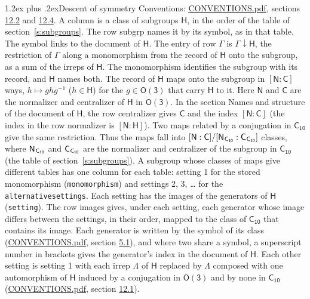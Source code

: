 \documentclass[10pt,a4paper]{article}
\makeatletter
\renewcommand\section{\@startsection{section}{1}{\z@}{-3ex plus -1ex minus -.2ex}%
  {1.2ex plus .2ex}{\normalfont\large\sffamily\bfseries\color{parttitle}}}
\numberwithin{equation}{section}
\newcommand{\grp}[1]{\mathsf{#1}}
\newcommand{\grpindex}[2]{[#1 : #2]}
\newcommand{\restr}[2]{#1\!\downarrow#2}
\newcommand{\hairsp}{\mkern1mu}
\makeatother
\begin{document}
\section{Descent of symmetry}\label{s:subduction}
Conventions: \href{../../CONVENTIONS.pdf}{CONVENTIONS.pdf}, sections \href{../../CONVENTIONS.pdf\#conv.12.2}{12.2} and \href{../../CONVENTIONS.pdf\#conv.12.4}{12.4}.
A column is a class of subgroups $\grp{H}$, in the order of the table of section~\ref{s:subgroups}. The row subgrp names it by its symbol, as in that table. The symbol links to the document of $\grp{H}$. The entry of row $\Gamma$ is $\restr{\Gamma}{\grp{H}}$, the restriction of $\Gamma$ along a monomorphism from the record of $\grp{H}$ onto the subgroup, as a sum of the irreps of $\grp{H}$. The monomorphism identifies the subgroup with its record, and $\grp{H}$ names both. \label{n:group.normalizer.o3}\label{n:group.centralizer.o3}The record of $\grp{H}$ maps onto the subgroup in $\grpindex{\grp{N}}{\grp{C}}$ ways, $h \mapsto g h g^{-1}$ ($h \in \grp{H}$) for the $g \in \grp{O(3)}$ that carry $\grp{H}$ to it. Here $\grp{N}$ and $\grp{C}$ are the normalizer and centralizer of $\grp{H}$ in \href{O3.pdf}{$\grp{O(3)}$}. In the section Names and structure of the document of $\grp{H}$, the row centralizer gives $\grp{C}$ and the index $\grpindex{\grp{N}}{\grp{C}}$ (the index in the row normalizer is $\grpindex{\grp{N}}{\grp{H}}$). Two maps related by a conjugation in $\grp{C_{10}}$ give the same restriction. Thus the maps fall into $\grpindex{\grp{N}}{\grp{C}}/\grpindex{\grp{N}_{\hairsp \grp{C_{10}}}}{\grp{C}_{\hairsp \grp{C_{10}}}}$ classes, where $\grp{N}_{\hairsp \grp{C_{10}}}$ and $\grp{C}_{\hairsp \grp{C_{10}}}$ are the normalizer and centralizer of the subgroup in $\grp{C_{10}}$ (the table of section~\ref{s:subgroups}). \label{n:head.setting}A subgroup whose classes of maps give different tables has one column for each table: setting 1 for the stored monomorphism (\texttt{monomorphism}) and settings 2, 3, \dots{} for the \texttt{alternativesettings}. Each setting has the images of the generators of $\grp{H}$ (\texttt{setting}). \label{n:head.images}The row images gives, under each setting, each generator whose image differs between the settings, in their order, mapped to the class of $\grp{C_{10}}$ that contains its image. Each generator is written by the symbol of its class (\href{../../CONVENTIONS.pdf}{CONVENTIONS.pdf}, section \href{../../CONVENTIONS.pdf\#conv.5.1}{5.1}), and where two share a symbol, a superscript number in brackets gives the generator's index in the document of $\grp{H}$. \label{n:irrep.Delta}Each other setting is setting 1 with each irrep $\Lambda$ of $\grp{H}$ replaced by $\Lambda$ composed with one automorphism of $\grp{H}$ induced by a conjugation in \href{O3.pdf}{$\grp{O(3)}$} and by none in $\grp{C_{10}}$ (\href{../../CONVENTIONS.pdf}{CONVENTIONS.pdf}, section \href{../../CONVENTIONS.pdf\#conv.12.1}{12.1}).
\end{document}
